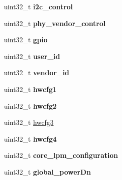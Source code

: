 \begin{DoxyCompactItemize}
\item 
\hypertarget{structdwc__regs_a5c48596b1d4167931ea97039bfe9dfb2}{uint32\-\_\-t {\bfseries i2c\-\_\-control}}\label{structdwc__regs_a5c48596b1d4167931ea97039bfe9dfb2}

\item 
\hypertarget{structdwc__regs_a7ae619cdbded4955f9d8be42b297918c}{uint32\-\_\-t {\bfseries phy\-\_\-vendor\-\_\-control}}\label{structdwc__regs_a7ae619cdbded4955f9d8be42b297918c}

\item 
\hypertarget{structdwc__regs_a4f5254e0a1a1d42691bf31685bf01443}{uint32\-\_\-t {\bfseries gpio}}\label{structdwc__regs_a4f5254e0a1a1d42691bf31685bf01443}

\item 
\hypertarget{structdwc__regs_a0663ced997f9333487457420354d0978}{uint32\-\_\-t {\bfseries user\-\_\-id}}\label{structdwc__regs_a0663ced997f9333487457420354d0978}

\item 
\hypertarget{structdwc__regs_a7adb9e358ce7d55fd546d833b0ce7c44}{uint32\-\_\-t {\bfseries vendor\-\_\-id}}\label{structdwc__regs_a7adb9e358ce7d55fd546d833b0ce7c44}

\item 
\hypertarget{structdwc__regs_a8e8f131c37a1273b8676d30930b58460}{uint32\-\_\-t {\bfseries hwcfg1}}\label{structdwc__regs_a8e8f131c37a1273b8676d30930b58460}

\item 
\hypertarget{structdwc__regs_a8e044541f265bab46aab4e65ad9f9242}{uint32\-\_\-t {\bfseries hwcfg2}}\label{structdwc__regs_a8e044541f265bab46aab4e65ad9f9242}

\item 
uint32\-\_\-t \hyperlink{structdwc__regs_a8c12bd03fc0263cffee12c1467519b7d}{hwcfg3}
\item 
\hypertarget{structdwc__regs_ae940cf93e605686e980f1bd38b347690}{uint32\-\_\-t {\bfseries hwcfg4}}\label{structdwc__regs_ae940cf93e605686e980f1bd38b347690}

\item 
\hypertarget{structdwc__regs_ae694e658288de8ac271ead39f271e862}{uint32\-\_\-t {\bfseries core\-\_\-lpm\-\_\-configuration}}\label{structdwc__regs_ae694e658288de8ac271ead39f271e862}

\item 
\hypertarget{structdwc__regs_a2107da464decc463f29e9ba2861be133}{uint32\-\_\-t {\bfseries global\-\_\-power\-Dn}}\label{structdwc__regs_a2107da464decc463f29e9ba2861be133}


\end{DoxyCompactItemize}
